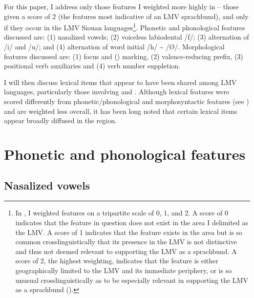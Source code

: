 \documentclass[output=paper]{LSP/langsci}
\begin{document}
For this paper, I address only those features I weighted more highly in \citet{Kaufman2014} -- those given a score of 2 (the features most indicative of an LMV sprachbund), and only if they occur in the LMV Siouan languages\footnote{In \citet{Kaufman2014}, I weighted features on a tripartite scale of 0, 1, and 2. A score of 0 indicates that the feature in question does not exist in the area I delimited as the LMV. A score of 1 indicates that the feature exists in the area but is so common crosslinguistically that its presence in the LMV is not distinctive and thus not deemed relevant to supporting the LMV as a sprachbund. A score of 2, the highest weighting, indicates that the feature is either geographically limited to the LMV and its immediate periphery, or is so unusual crosslinguistically as to be especially relevant in supporting the LMV as a sprachbund (\citealt{Kaufman2014}).}. Phonetic and phonological features discussed are: (1) nasalized vowels; (2) voiceless labiodental  /f/; (3) alternation of /i/ and /u/; and (4) alternation of word initial /h/ \textasciitilde{} /Ø/. Morphological features discussed are: (1) focus and  () marking, (2) valence-reducing prefix, (3) positional verb auxiliaries and (4) verb number suppletion. 

I will then discuss lexical items that appear to have been shared among LMV languages, particularly those involving  and . Although lexical features were scored differently from phonetic/phonological and morphosyntactic features (see \citealt{Kaufman2014}) and are weighted less overall, it has been long noted that certain lexical items appear broadly diffused in the region. 

\section{Phonetic and phonological features}

\subsection{Nasalized vowels}
\end{document}
